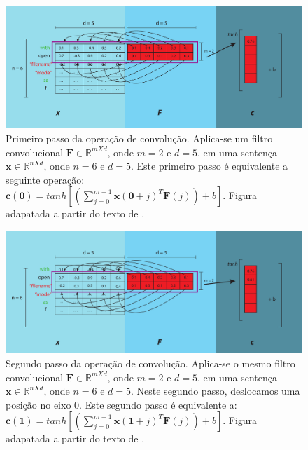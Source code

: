 \begin{figure}[h]
    \centering
    \includegraphics[width=1\textwidth]{figuras/cap-problema/first-step-convolution.pdf}
    \caption{Primeiro passo da operação de convolução. Aplica-se um filtro convolucional $\bm{F} \in \mathbb{R}^{m X d}$, onde $m = 2$ e $d = 5$, em uma sentença $\bm{x} \in \mathbb{R}^{n X d}$, onde $n = 6$ e $d = 5$. Este primeiro passo é equivalente a seguinte operação: $\bm{c}(\bm{0}) = tanh \left[\left(\sum_{j=0}^{m - 1} \bm{x}(\bm{0} + j)^{T}\bm{F}(j)\right) + b\right]$. Figura adapatada a partir do texto de \cite{joshua-kim-cnn-understanding-word-embeddings-2019}.} 
    \label{fig:first-step-convolutional}
\end{figure}

\begin{figure}[h]
    \centering
    \includegraphics[width=1\textwidth]{figuras/cap-problema/second-step-convolution.pdf}
    \caption{Segundo passo da operação de convolução. Aplica-se o mesmo filtro convolucional $\bm{F} \in \mathbb{R}^{m X d}$, onde $m = 2$ e $d = 5$, em uma sentença $\bm{x} \in \mathbb{R}^{n X d}$, onde $n = 6$ e $d = 5$. Neste segundo passo, deslocamos uma posição no eixo $0$. Este segundo passo é equivalente a: $\bm{c}(\bm{1}) = tanh [(\sum_{j=0}^{m - 1} \bm{x}(\bm{1} + j)^{T}\bm{F}(j)) + b]$. Figura adapatada a partir do texto de \cite{joshua-kim-cnn-understanding-word-embeddings-2019}.}
    \label{fig:second-step-convolutional}
\end{figure}


